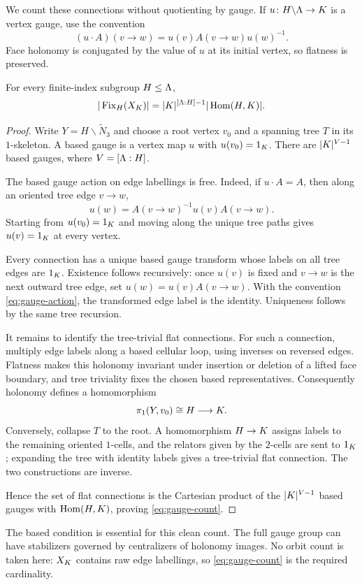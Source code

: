 We count these connections without quotienting by gauge.  If
$u\colon H\backslash\Lambda\to K$ is a vertex gauge, use the convention
\begin{equation}
 (u\cdot A)(v\to w)=u(v)A(v\to w)u(w)^{-1}.
 \label{eq:gauge-action}
\end{equation}
Face holonomy is conjugated by the value of $u$ at its initial vertex, so
flatness is preserved.

\begin{proposition}
\label{prop:gauge-count}
For every finite-index subgroup $H\leq\Lambda$,
\begin{equation}
 |\operatorname{Fix}_H(X_{K})|
 =|K|^{[\Lambda:H]-1}|\operatorname{Hom}(H,K)|.
 \label{eq:gauge-count}
\end{equation}
\end{proposition}

\begin{proof}
Write $Y=H\backslash\widetilde N_3$ and choose a root vertex $v_0$ and a
spanning tree $T$ in its $1$-skeleton.  A based gauge is a vertex map $u$ with
$u(v_0)=1_{K}$.  There are $|K|^{V-1}$ based gauges, where
$V=[\Lambda:H]$.

The based gauge action on edge labellings is free.  Indeed, if $u\cdot A=A$,
then along an oriented tree edge $v\to w$,
\[
 u(w)=A(v\to w)^{-1}u(v)A(v\to w).
\]
Starting from $u(v_0)=1_{K}$ and moving along the unique tree paths gives
$u(v)=1_{K}$ at every vertex.

Every connection has a unique based gauge transform whose labels on all tree
edges are $1_{K}$.  Existence follows recursively: once $u(v)$ is fixed and
$v\to w$ is the next outward tree edge, set $u(w)=u(v)A(v\to w)$.  With the
convention \eqref{eq:gauge-action}, the transformed edge label is the identity.
Uniqueness follows by the same tree recursion.

It remains to identify the tree-trivial flat connections.  For such a
connection, multiply edge labels along a based cellular loop, using inverses
on reversed edges.  Flatness makes this holonomy invariant under insertion or
deletion of a lifted face boundary, and tree triviality fixes the chosen
based representatives.  Consequently holonomy defines a homomorphism
\[
 \pi_1(Y,v_0)\cong H\longrightarrow K.
\]
Conversely, collapse $T$ to the root.  A homomorphism $H\to K$ assigns labels
to the remaining oriented $1$-cells, and the relators given by the $2$-cells
are sent to $1_{K}$; expanding the tree with identity labels gives a
tree-trivial flat connection.  The two constructions are inverse.

Hence the set of flat connections is the Cartesian product of the
$|K|^{V-1}$ based gauges with $\operatorname{Hom}(H,K)$, proving
\eqref{eq:gauge-count}.
\end{proof}

\begin{remark}
\label{rem:unbased-gauge}
The based condition is essential for this clean count.  The full gauge group
can have stabilizers governed by centralizers of holonomy images.  No orbit
count is taken here: $X_{K}$ contains raw edge labellings, so
\eqref{eq:gauge-count} is the required cardinality.
\end{remark}

